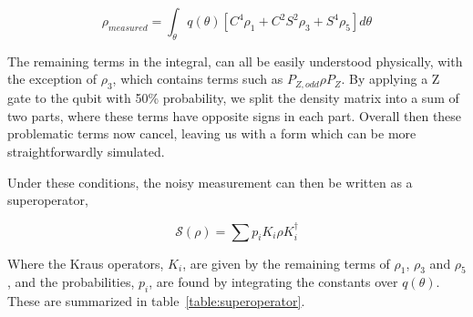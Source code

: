 \documentclass[prl, twocolumn, ,superscriptaddress]{revtex4-1}
\begin{document}

\[
\rho_{measured}  = \int_{\theta} q(\theta) \left[ C^{4} \rho_1 +C^{2}S^{2} \rho_3 + S^{4} \rho_5 \right] d\theta
\]
 
The remaining terms in the integral, can all be easily understood physically, with the exception of $\rho_3$, which contains terms such as $P_{Z,odd}\rho P_{Z}$. By applying a Z gate to the qubit with 50\% probability, we split the density matrix into a sum of two parts, where these terms have opposite signs in each part. Overall then these problematic terms now cancel, leaving us with a form which can be more straightforwardly simulated. 

Under these conditions, the noisy measurement can then be written as a superoperator,

\[
\mathcal{S}\left(\rho\right)=\sum p_{i}K_{i}\rho K_{i}^{\dagger}
\]

Where the Kraus operators, $K_i$, are given by the remaining terms of $\rho_1$, $\rho_3$ and $\rho_5$, and the probabilities, $p_i$, are found by integrating the constants over $q(\theta)$. These are summarized in table~\ref{table:superoperator}.

%
%
%
%
%
%
%
\end{document}
